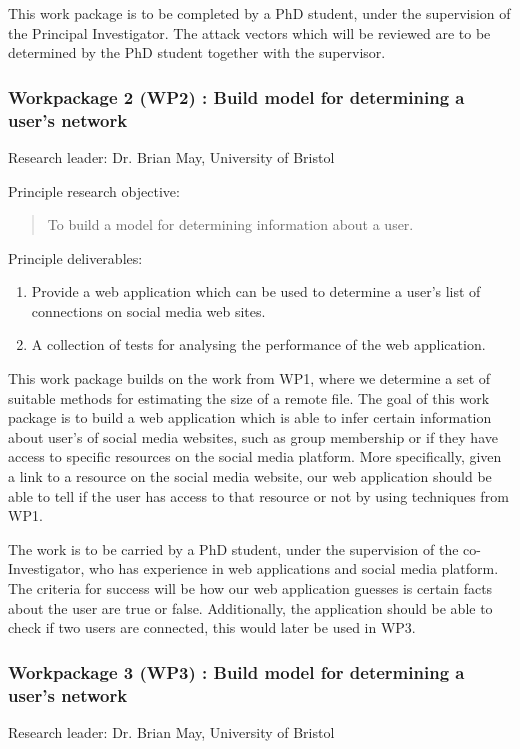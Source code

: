 \documentclass[a4paper,11pt]{article}
\begin{document}
This work package is to be completed by a PhD student, under the supervision of the Principal Investigator. The attack vectors which will be reviewed are to be determined by the PhD student together with the supervisor.


\subsubsection*{Workpackage 2 (WP2) : Build model for determining a user's network}
Research leader: Dr. Brian May, University of Bristol

Principle research objective:
\begin{quote}
	To build a model for determining information about a user.
\end{quote}

Principle deliverables:
\begin{enumerate}
\item Provide a web application which can be used to determine a user's list of connections on social media web sites.
\item A collection of tests for analysing the performance of the web application.
\end{enumerate}

This work package builds on the work from WP1, where we determine a set of suitable methods for estimating the size of a remote file. The goal of this work package is to build a web application which is able to infer certain information about user's of social media websites, such as group membership or if they have access to specific resources on the social media platform. More specifically, given a link to a resource on the social media website, our web application should be able to tell if the user has access to that resource or not by using techniques from WP1.

The work is to be carried by a PhD student, under the supervision of the co-Investigator, who has experience in web applications and social media platform. The criteria for success will be how  our web application guesses is certain facts about the user are true or false. Additionally, the application should be able to check if two users are connected, this would later be used in WP3.

\subsubsection*{Workpackage 3 (WP3) : Build model for determining a user's network}
Research leader: Dr. Brian May, University of Bristol
\end{document}
